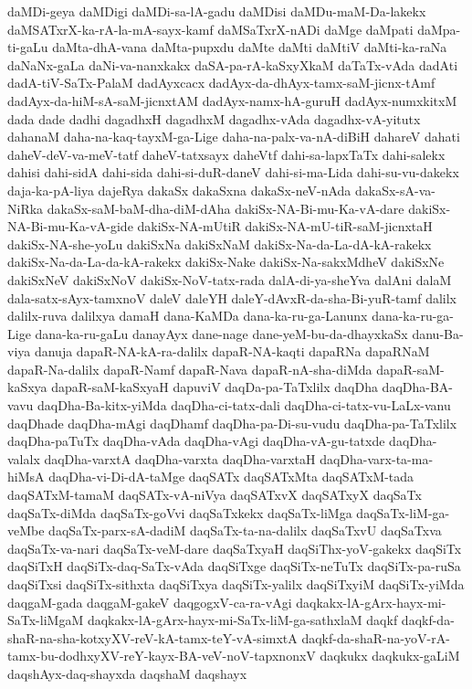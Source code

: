 {daMDi-geya
daMDigi
daMDi-sa-lA-gadu
daMDisi
daMDu-maM-Da-lakekx
daMSATxrX-ka-rA-la-mA-sayx-kamf
daMSaTxrX-nADi
daMge
daMpati
daMpa-ti-gaLu
daMta-dhA-vana
daMta-pupxdu
daMte
daMti
daMtiV
daMti-ka-raNa
daNaNx-gaLa
daNi-va-nanxkakx
daSA-pa-rA-kaSxyXkaM
daTaTx-vAda
dadAti
dadA-tiV-SaTx-PalaM
dadAyxcacx
dadAyx-da-dhAyx-tamx-saM-jicnx-tAmf
dadAyx-da-hiM-sA-saM-jicnxtAM
dadAyx-namx-hA-guruH
dadAyx-numxkitxM
dada
dade
dadhi
dagadhxH
dagadhxM
dagadhx-vAda
dagadhx-vA-yitutx
dahanaM
daha-na-kaq-tayxM-ga-Lige
daha-na-palx-va-nA-diBiH
dahareV
dahati
daheV-deV-va-meV-tatf
daheV-tatxsayx
daheVtf
dahi-sa-lapxTaTx
dahi-salekx
dahisi
dahi-sidA
dahi-sida
dahi-si-duR-daneV
dahi-si-ma-Lida
dahi-su-vu-dakekx
daja-ka-pA-liya
dajeRya
dakaSx
dakaSxna
dakaSx-neV-nAda
dakaSx-sA-va-NiRka
dakaSx-saM-baM-dha-diM-dAha
dakiSx-NA-Bi-mu-Ka-vA-dare
dakiSx-NA-Bi-mu-Ka-vA-gide
dakiSx-NA-mUtiR
dakiSx-NA-mU-tiR-saM-jicnxtaH
dakiSx-NA-she-yoLu
dakiSxNa
dakiSxNaM
dakiSx-Na-da-La-dA-kA-rakekx
dakiSx-Na-da-La-da-kA-rakekx
dakiSx-Nake
dakiSx-Na-sakxMdheV
dakiSxNe
dakiSxNeV
dakiSxNoV
dakiSx-NoV-tatx-rada
dalA-di-ya-sheYva
dalAni
dalaM
dala-satx-sAyx-tamxnoV
daleV
daleYH
daleY-dAvxR-da-sha-Bi-yuR-tamf
dalilx
dalilx-ruva
dalilxya
damaH
dana-KaMDa
dana-ka-ru-ga-Lanunx
dana-ka-ru-ga-Lige
dana-ka-ru-gaLu
danayAyx
dane-nage
dane-yeM-bu-da-dhayxkaSx
danu-Ba-viya
danuja
dapaR-NA-kA-ra-dalilx
dapaR-NA-kaqti
dapaRNa
dapaRNaM
dapaR-Na-dalilx
dapaR-Namf
dapaR-Nava
dapaR-nA-sha-diMda
dapaR-saM-kaSxya
dapaR-saM-kaSxyaH
dapuviV
daqDa-pa-TaTxlilx
daqDha
daqDha-BA-vavu
daqDha-Ba-kitx-yiMda
daqDha-ci-tatx-dali
daqDha-ci-tatx-vu-LaLx-vanu
daqDhade
daqDha-mAgi
daqDhamf
daqDha-pa-Di-su-vudu
daqDha-pa-TaTxlilx
daqDha-paTuTx
daqDha-vAda
daqDha-vAgi
daqDha-vA-gu-tatxde
daqDha-valalx
daqDha-varxtA
daqDha-varxta
daqDha-varxtaH
daqDha-varx-ta-ma-hiMsA
daqDha-vi-Di-dA-taMge
daqSATx
daqSATxMta
daqSATxM-tada
daqSATxM-tamaM
daqSATx-vA-niVya
daqSATxvX
daqSATxyX
daqSaTx
daqSaTx-diMda
daqSaTx-goVvi
daqSaTxkekx
daqSaTx-liMga
daqSaTx-liM-ga-veMbe
daqSaTx-parx-sA-dadiM
daqSaTx-ta-na-dalilx
daqSaTxvU
daqSaTxva
daqSaTx-va-nari
daqSaTx-veM-dare
daqSaTxyaH
daqSiThx-yoV-gakekx
daqSiTx
daqSiTxH
daqSiTx-daq-SaTx-vAda
daqSiTxge
daqSiTx-neTuTx
daqSiTx-pa-ruSa
daqSiTxsi
daqSiTx-sithxta
daqSiTxya
daqSiTx-yalilx
daqSiTxyiM
daqSiTx-yiMda
daqgaM-gada
daqgaM-gakeV
daqgogxV-ca-ra-vAgi
daqkakx-lA-gArx-hayx-mi-SaTx-liMgaM
daqkakx-lA-gArx-hayx-mi-SaTx-liM-ga-sathxlaM
daqkf
daqkf-da-shaR-na-sha-kotxyXV-reV-kA-tamx-teY-vA-simxtA
daqkf-da-shaR-na-yoV-rA-tamx-bu-dodhxyXV-reY-kayx-BA-veV-noV-tapxnonxV
daqkukx
daqkukx-gaLiM
daqshAyx-daq-shayxda
daqshaM
daqshayx
}
